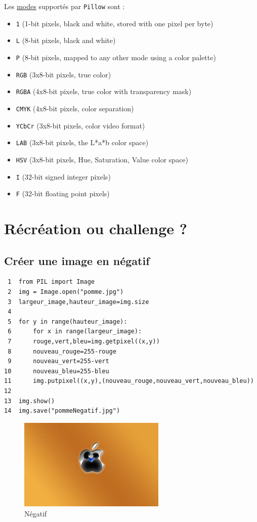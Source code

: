 \documentclass[11pt]{article}
\begin{document}
Les \href{https://pillow.readthedocs.io/en/latest/handbook/concepts.html\#modes}{modes} supportés par \texttt{Pillow} sont : 

\begin{itemize}
\item \texttt{1} (1-bit pixels, black and white, stored with one pixel per byte)
\item \texttt{L} (8-bit pixels, black and white)
\item \texttt{P} (8-bit pixels, mapped to any other mode using a color palette)
\item \texttt{RGB} (3x8-bit pixels, true color)
\item \texttt{RGBA} (4x8-bit pixels, true color with transparency mask)
\item \texttt{CMYK} (4x8-bit pixels, color separation)
\item \texttt{YCbCr} (3x8-bit pixels, color video format)
\item \texttt{LAB} (3x8-bit pixels, the L*a*b color space)
\item \texttt{HSV} (3x8-bit pixels, Hue, Saturation, Value color space)
\item \texttt{I} (32-bit signed integer pixels)
\item \texttt{F} (32-bit floating point pixels)
\end{itemize}



\section{Récréation ou challenge ?}
\label{sec:org33294cc}

\subsection{Créer une image en négatif}
\label{sec:org7296f64}

\begin{verbatim}
 1  from PIL import Image
 2  img = Image.open("pomme.jpg")
 3  largeur_image,hauteur_image=img.size
 4  
 5  for y in range(hauteur_image):
 6      for x in range(largeur_image):
 7  	rouge,vert,bleu=img.getpixel((x,y))
 8  	nouveau_rouge=255-rouge
 9  	nouveau_vert=255-vert
10  	nouveau_bleu=255-bleu
11  	img.putpixel((x,y),(nouveau_rouge,nouveau_vert,nouveau_bleu))
12  
13  img.show()
14  img.save("pommeNegatif.jpg")
\end{verbatim}

\begin{figure}[htbp]
\centering
\includegraphics[width=7cm]{pommeNegatif.jpg}
\caption{Négatif}
\end{figure}
\end{document}
